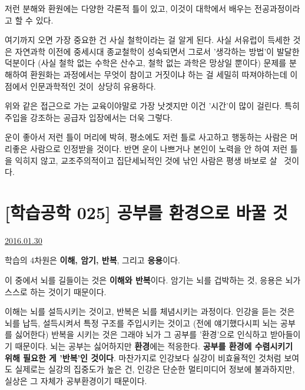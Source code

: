 저런 분해와 환원에는 다양한 각론적 틀이 있고, 이것이 대학에서 배우는 전공과정이라고 할 수 있다.
\vspace{5mm}

여기까지 오면 가장 중요한 건 사실 철학이라는 걸 알게 된다.
사실 서유럽이 득세한 것은 자연과학 이전에 중세시대 종교철학이 성숙되면서 그로서 '생각하는 방법'이 발달한 덕분이다
(사실 철학 없는 수학은 산수고, 철학 없는 과학은 망상일 뿐이다)
문제를 분해하여 환원화는 과정에서는 무엇이 참이고 거짓이냐 하는 걸 세밀히 따져야하는데
이 점에서 인문과학적인 것이 상당히 유용하다.
\vspace{5mm}

위와 같은 접근으로 가는 교육이야말로 가장 낫겟지만 이건 '시간'이 많이 걸린다.
특히 주입을 강조하는 공급자 입장에서는 더욱 그렇다.
\vspace{5mm}

운이 좋아서 저런 틀이 머리에 박혀, 평소에도 저런 틀로 사고하고 행동하는 사람은 머리좋은 사람으로 인정받을 것이다.
반면 운이 나쁘거나 본인이 노력을 안 하여 저런 틀을 익히지 않고, 교조주의적이고 집단세뇌적인 것에 낚인 사람은 평생 바보로 살  것이다.
\vspace{5mm}




\section{[학습공학 025] 공부를 환경으로 바꿀 것}
\href{https://www.kockoc.com/Apoc/616830}{2016.01.30}

\vspace{5mm}

학습의 4차원은 \textbf{이해, 암기, 반복}, 그리고 \textbf{응용}이다.
\vspace{5mm}

이 중에서 뇌를 길들이는 것은 \textbf{이해와 반복}이다.
암기는 뇌를 겁박하는 것, 응용은 뇌가 스스로 하는 것이기 때문이다.
\vspace{5mm}

이해는 뇌를 설득시키는 것이고, 반복은 뇌를 체념시키는 과정이다.
인강을 듣는 것은 뇌를 납득, 설득시켜서 특정 구조를 주입시키는 것이고 (전에 얘기했다시피 뇌는 공부를 싫어한다)
반복을 시키는 것은 그래야 뇌가 그 공부를 '환경'으로 인식하고 받아들이기 때문이다.
뇌는 공부는 싫어하지만 \textbf{환경}에는 적응한다. \textbf{공부를 \textbf{환경}에 수렴시키기 위해 필요한 게 '반복'인 것이다}.
마찬가지로 인강보다 실강이 비효율적인 것처럼 보여도 실제로는 실강의 집중도가 높은 건,
인강은 단순한 멀티미디어 정보에 불과하지만, 실상은 그 자체가 공부환경이기 때문이다.
\vspace{5mm}

